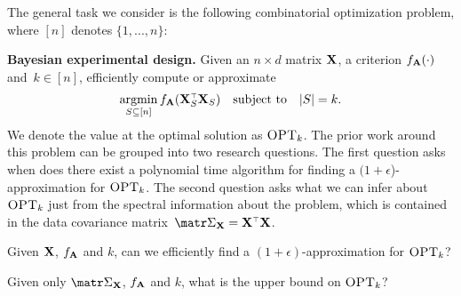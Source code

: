\documentclass[../../thesis.tex]{subfiles}
\begin{document}
The general task we consider is the following combinatorial
optimization problem, where $[n]$
denotes $\{1,...,n\}$:

\textbf{Bayesian experimental design.}
Given an $n\times d$ matrix $\mathbf X$,
a criterion $f_{\mathbf A}(\cdot)$ and~$k\in[n]$,
efficiently compute or approximate
\begin{align*}
  \argmin_{S \subseteq [n]} f_{\A}(\X_S^\top\X_S)\quad\text{subject
    to}\quad |S|=k.
\end{align*}
We denote the value at the optimal solution as ${\textsc{OPT}_k}$.
The prior work around this problem can be grouped into two research questions.
The first question asks when does there exist a
polynomial time algorithm for finding a $(1+\epsilon$)-approximation
for ${\textsc{OPT}_k}$.
The second question asks what we can
infer about ${\textsc{OPT}_k}$ just from the spectral
information about the problem, which is contained in the
data covariance matrix~$\Sigmab_\X=\X^\top\X$.


\begin{question}\label{q:bayesian:q1}
  Given $\mathbf X$, $f_{\mathbf A}$ and $k$, can we efficiently find a $(1+\epsilon)$-approximation for
  ${\textsc{OPT}_k}$?
\end{question}

\begin{question}\label{q:bayesian:q2}
  Given only $\Sigmab_{\X}$, $f_{\mathbf A}$ and $k$,
  what is the upper bound on ${\textsc{OPT}_k}$?
\end{question}
\end{document}
